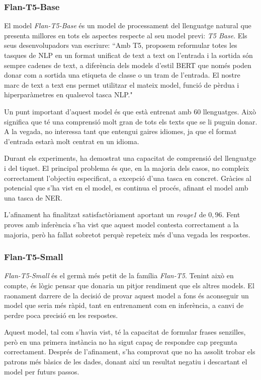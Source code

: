 \subsubsection{Flan-T5-Base}
El model \textit{Flan-T5-Base} \cite{flan-t5} és un model de processament del llenguatge natural que presenta millores en tots els aspectes respecte al seu model previ: \textit{T5 Base}. Els seus desenvolupadors van escriure: ``Amb T5, proposem reformular totes les tasques de NLP en un format unificat de text a text on l'entrada i la sortida són sempre cadenes de text, a diferència dels models d'estil BERT que només poden donar com a sortida una etiqueta de classe o un tram de l'entrada. El nostre marc de text a text ens permet utilitzar el mateix model, funció de pèrdua i hiperparàmetres en qualsevol tasca NLP."

Un punt important d'aquest model és que està entrenat amb 60 llenguatges. Això significa que té una comprensió molt gran de tots els texts que se li puguin donar. A la vegada, no interessa tant que entengui gaires idiomes, ja que el format d'entrada estarà molt centrat en un idioma.

Durant els experiments, ha demostrat una capacitat de comprensió del llenguatge i del tiquet. El principal problema és que, en la majoria dels casos, no compleix correctament l'objectiu especificat, a excepció d'una tasca en concret. Gràcies al potencial que s'ha vist en el model, es continua el procés, afinant el model amb una tasca de NER.

L'afinament ha finalitzat satisfactòriament aportant un \textit{rouge1} de $0,96$. Fent proves amb inferència s'ha vist que aquest model contesta correctament a la majoria, però ha fallat sobretot perquè repeteix més d'una vegada les respostes.

\subsubsection{Flan-T5-Small}
\textit{Flan-T5-Small} \cite{flan-t5} és el germà més petit de la família \textit{Flan-T5}. Tenint això en compte, és lògic pensar que donaria un pitjor rendiment que els altres models. El raonament darrere de la decisió de provar aquest model a fons és aconseguir un model que seria més ràpid, tant en entrenament com en inferència, a canvi de perdre poca precisió en les respostes.

Aquest model, tal com s'havia vist, té la capacitat de formular frases senzilles, però en una primera instància no ha sigut capaç de respondre cap pregunta correctament. Després de l'afinament, s'ha comprovat que no ha assolit trobar els patrons més bàsics de les dades, donant així un resultat negatiu i descartant el model per futurs passos.

